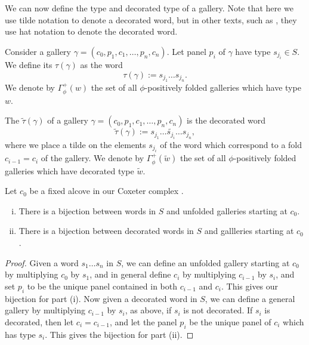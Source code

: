 \documentclass[11pt]{article}
\begin{document}
We can now define the type and decorated type of a gallery. Note that here we use tilde notation to denote a decorated word, but in other texts, such as \cite{SHA}, they use hat notation to denote the decorated word.

\begin{definition}
    Consider a gallery $\gamma = (c_0,p_1,c_1,\hdots ,p_n,c_n)$. Let panel $p_i$ of $\gamma$ have type $s_{j_i}\in S$. We define its  $\tau(\gamma)$ as the word 
    \[\tau(\gamma):=s_{j_1}\hdots s_{j_n}.\]
    We denote by $\Gamma_{\phi}^+(w)$ the set of all $\phi$-positively folded galleries which have type $w$. 
\end{definition}

\begin{definition}
    The  $\tilde\tau(\gamma)$ of a gallery $\gamma = (c_0,p_1,c_1,\hdots ,p_n,c_n)$ is the decorated word
    \[\tilde\tau(\gamma):= s_{j_1}\hdots \tilde{s_{j_i}}\hdots s_{j_n},\]
    where we place a tilde on the elements $s_{j_i}$ of the word which correspond to a fold $c_{i-1}=c_i$ of the gallery. We denote by $\Gamma_{\phi}^+(\tilde{w})$ the set of all $\phi$-positively folded galleries which have decorated type $\tilde{w}$.
\end{definition}


\begin{lemma}\cite[p.128]{SHA}
    Let $c_0$ be a fixed alcove in our Coxeter complex \sg. 
    \begin{enumerate}[(i)]
        \item There is a bijection between words in $S$ and unfolded galleries starting at $c_0$.
        \item There is a bijection between decorated words in $S$ and gallleries starting at $c_0$. 
    \end{enumerate}
\end{lemma}

\begin{proof}
    Given a word $s_1\hdots s_n$ in $S$, we can define an unfolded gallery starting at $c_0$ by multiplying $c_0$ by $s_1$, and in general define $c_i$ by multiplying $c_{i-1}$ by $s_{i}$, and set $p_i$ to be the unique panel contained in both $c_{i-1}$ and $c_i$. This gives our bijection for part (i). 
    Now given a decorated word in $S$, we can define a general gallery by multiplying $c_{i-1}$ by $s_{i}$, as above, if $s_{i}$ is not decorated. If $s_{i}$ is decorated, then let $c_i=c_{i-1}$, and let the panel $p_i$ be the unique panel of $c_i$ which has type $s_i$. This gives the bijection for part (ii). 
\end{proof}
\end{document}
